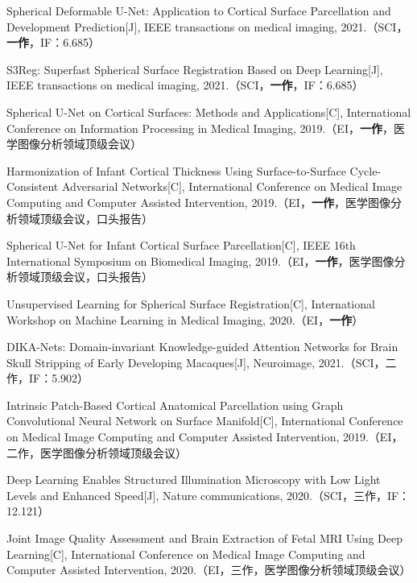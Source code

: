         
        
        {
        \noindent [1] Spherical Deformable U-Net: Application to Cortical Surface Parcellation and Development Prediction[J], IEEE transactions on medical imaging, 2021.（SCI，\textbf{一作}，IF：6.685）
        
        \noindent [2] S3Reg: Superfast Spherical Surface Registration Based on Deep Learning[J], IEEE transactions on medical imaging, 2021.（SCI，\textbf{一作}，IF：6.685）
        
        \noindent [3] Spherical U-Net on Cortical Surfaces: Methods and Applications[C], International Conference on Information Processing in Medical Imaging, 2019.（EI，\textbf{一作}，医学图像分析领域顶级会议）
        
        \noindent [4] Harmonization of Infant Cortical Thickness Using Surface-to-Surface Cycle-Consistent Adversarial Networks[C], International Conference on Medical Image Computing and Computer Assisted Intervention, 2019.（EI，\textbf{一作}，医学图像分析领域顶级会议，口头报告）
        
        \noindent [5] Spherical U-Net for Infant Cortical Surface Parcellation[C], IEEE 16th International Symposium on Biomedical Imaging, 2019.（EI，\textbf{一作}，医学图像分析领域顶级会议，口头报告）
        
        \noindent [6] Unsupervised Learning for Spherical Surface Registration[C], International Workshop on Machine Learning in Medical Imaging, 2020.（EI，\textbf{一作}）
        
        \noindent [7] DIKA-Nets: Domain-invariant Knowledge-guided Attention Networks for Brain Skull Stripping of Early Developing Macaques[J], Neuroimage, 2021.（SCI，二作，IF：5.902） 
        
        \noindent [8] Intrinsic Patch-Based Cortical Anatomical Parcellation using Graph Convolutional Neural Network on Surface Manifold[C], International Conference on Medical Image Computing and Computer Assisted Intervention, 2019.（EI，二作，医学图像分析领域顶级会议）
        
        \noindent [9] Deep Learning Enables Structured Illumination Microscopy with Low Light Levels and Enhanced Speed[J], Nature communications, 2020.（SCI，三作，IF：12.121）
        
        \noindent [10] Joint Image Quality Assessment and Brain Extraction of Fetal MRI Using Deep Learning[C], International Conference on Medical Image Computing and Computer Assisted Intervention, 2020.（EI，三作，医学图像分析领域顶级会议）
        
}
